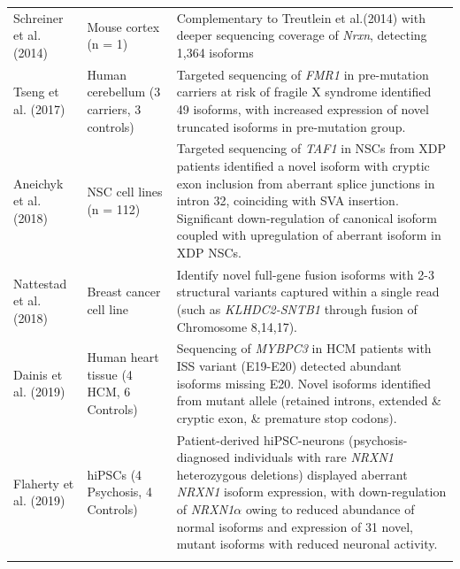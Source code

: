 \begin{landscape}
\begin{longtable}[c]{p{4cm}p{4cm}p{18cm}}
		\centering Schreiner et al. (2014)\cite{Schreiner2014} &
		\centering Mouse cortex (n = 1) &
		\tabitem Complementary to Treutlein et al.(2014) with deeper sequencing coverage of \textit{Nrxn}, detecting 1,364 isoforms\\
		\hdashline[0.5pt/5pt]
		
		\centering Tseng et al. (2017) \cite{Tseng2017} &
		\centering Human cerebellum \newline (3 carriers, 3 controls)  &
		\tabitem Targeted sequencing of \textit{FMR1} in pre-mutation carriers at risk of fragile X syndrome identified 49 isoforms, with increased expression of novel truncated isoforms in pre-mutation group. \\
		\hdashline[0.5pt/5pt]	
		
		\centering Aneichyk et al. (2018) \cite{Aneichyk2018} &
		\centering NSC cell lines (n = 112)  &
		\tabitem Targeted sequencing of \textit{TAF1} in NSCs from XDP patients identified a novel isoform with cryptic exon inclusion from aberrant splice junctions in intron 32, coinciding with SVA insertion. \newline
		\tabitem Significant down-regulation of canonical isoform coupled with upregulation of aberrant isoform in XDP NSCs.\\
		\hdashline[0.5pt/5pt]	
		
		\centering Nattestad et al. (2018) \cite{Nattestad2018} &
		\centering Breast cancer cell line  &
		\tabitem Identify novel full-gene fusion isoforms with 2-3 structural variants captured within a single read (such as \textit{KLHDC2-SNTB1} through fusion of Chromosome 8,14,17). \\			
		
		\centering Dainis et al. (2019) \cite{Dainis2019} &
		\centering Human heart tissue (4 HCM, 6 Controls) &
		\tabitem Sequencing of \textit{MYBPC3} in HCM patients with ISS variant (E19-E20) detected abundant isoforms missing E20. \newline
		\tabitem Novel isoforms identified from mutant allele (retained introns, extended \& cryptic exon, \& premature stop codons).  \\
		
		\centering Flaherty et al. (2019) \cite{Flaherty2019} &
		\centering hiPSCs \newline (4 Psychosis, 4 Controls)  &
		\tabitem Patient-derived hiPSC-neurons (psychosis-diagnosed individuals with rare \textit{NRXN1} heterozygous deletions) displayed aberrant \textit{NRXN1} isoform expression, with down-regulation of \textit{NRXN1$\alpha$} owing to reduced abundance of normal isoforms and expression of 31 novel, mutant isoforms with reduced neuronal activity.  \\
		\hdashline[0.5pt/5pt]
		

\end{longtable}
\end{landscape}

